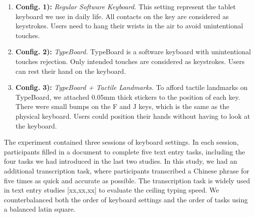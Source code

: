 \begin{enumerate}
	\item{\textbf{Config. 1):} \emph{Regular Software Keyboard.} This setting represent the tablet keyboard we use in daily life. All contacts on the key are considered as keystrokes. Users need to hang their wrists in the air to avoid unintentional touches.}
	\item{\textbf{Config. 2):} \emph{TypeBoard.} TypeBoard is a software keyboard with unintentional touches rejection. Only intended touches are considered as keystrokes. Users can rest their hand on the keyboard.}
	\item{\textbf{Config. 3):} \emph{TypeBoard + Tactile Landmarks.} To afford tactile landmarks on TypeBoard, we attached 0.05mm thick stickers to the position of each key. There were small bumps on the F and J keys, which is the same as the physical keyboard. Users could position their hands without having to look at the keyboard.}
\end{enumerate}


The experiment contained three sessions of keyboard settings. In each session, participants filled in a document to complete five text entry tasks, including the four tasks we had introduced in the last two studies. In this study, we had an additional transcription task, where participants transcribed a Chinese phrase for five times as quick and accurate as possible. The transcription task is widely used in text entry studies [xx,xx,xx] to evaluate the ceiling typing speed. We counterbalanced both the order of keyboard settings and the order of tasks using a balanced latin square.


